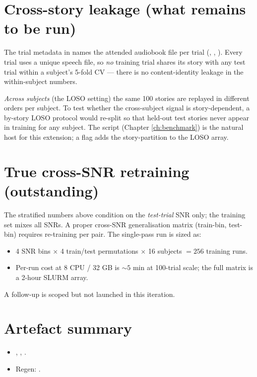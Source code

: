 \section{Cross-story leakage (what remains to be run)}

The trial metadata in  names the attended audiobook
file per trial (, , ).
Every trial uses a unique speech file, so \emph{no} training trial
shares its story with any test trial within a subject's 5-fold CV ---
there is no content-identity leakage in the within-subject numbers.

\emph{Across subjects} (the LOSO setting) the same 100 stories are
replayed in different orders per subject. To test whether the
cross-subject signal is story-dependent, a by-story LOSO protocol
would re-split so that held-out test stories never appear in training
for any subject. The  script (Chapter
\ref{ch:benchmark}) is the natural host for this extension; a
 flag adds the story-partition to the LOSO
array.

\section{True cross-SNR retraining (outstanding)}

The stratified numbers above condition on the \emph{test-trial} SNR
only; the training set mixes all SNRs. A proper cross-SNR generalisation
matrix (train-bin, test-bin) requires re-training per pair. The
single-pass run is sized as:
\begin{itemize}
  \item 4 SNR bins $\times$ 4 train/test permutations $\times$ 16
        subjects $= 256$ training runs.
  \item Per-run cost at 8 CPU / 32 GB is $\sim 5$ min at 100-trial
        scale; the full matrix is a 2-hour SLURM array.
\end{itemize}
A  follow-up is scoped but not launched in
this iteration.

\section{Artefact summary}

\begin{itemize}
  \item {}, ,
        .
  \item Regen: .
\end{itemize}
